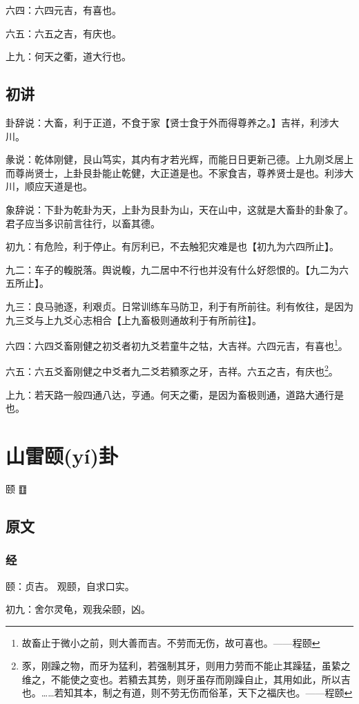 \documentclass[12pt,oneside]{book}
\begin{document}
六四：六四元吉，有喜也。

六五：六五之吉，有庆也。

上九：何天之衢，道大行也。

\section{初讲}
卦辞说：大畜，利于正道，不食于家【贤士食于外而得尊养之。】吉祥，利涉大川。

彖说：乾体刚健，艮山笃实，其内有才若光辉，而能日日更新己德。上九刚爻居上而尊尚贤士，上卦艮卦能止乾健，大正道是也。不家食吉，尊养贤士是也。利涉大川，顺应天道是也。

象辞说：下卦为乾卦为天，上卦为艮卦为山，天在山中，这就是大畜卦的卦象了。君子应当多识前言往行，以畜其德。

初九：有危险，利于停止。有厉利已，不去触犯灾难是也【初九为六四所止】。

九二：车子的輹脱落。舆说輹，九二居中不行也并没有什么好怨恨的。【九二为六五所止】。

九三：良马驰逐，利艰贞。日常训练车马防卫，利于有所前往。利有攸往，是因为九三爻与上九爻心志相合【上九畜极则通故利于有所前往】。

六四：六四爻畜刚健之初爻者初九爻若童牛之牯，大吉祥。六四元吉，有喜也\footnote{故畜止于微小之前，则大善而吉。不劳而无伤，故可喜也。——程颐}。

六五：六五爻畜刚健之中爻者九二爻若豶豕之牙，吉祥。六五之吉，有庆也\footnote{豕，刚躁之物，而牙为猛利，若强制其牙，则用力劳而不能止其躁猛，虽絷之维之，不能使之变也。若豶去其势，则牙虽存而刚躁自止，其用如此，所以吉也。……若知其本，制之有道，则不劳无伤而俗革，天下之福庆也。——程颐}。

上九：若天路一般四通八达，亨通。何天之衢，是因为畜极则通，道路大通行是也。

\chapter{山雷颐(yí)卦}
颐 {\Large ䷚}

\section{原文}

\subsection{经}
颐：贞吉。 观颐，自求口实。

初九：舍尔灵龟，观我朵颐，凶。
\end{document}
